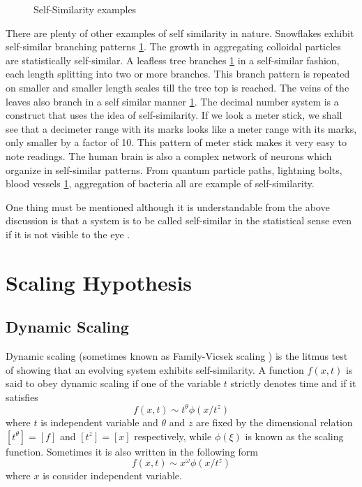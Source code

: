 \begin{figure}
		\caption{Self-Similarity examples}
		\label{fig:example-self-similarity}
	\end{figure}


	There are plenty of other examples of self similarity in nature. Snowflakes exhibit self-similar branching patterns \ref{fig:example-self-similarity}. The growth in aggregating colloidal particles are statistically self-similar. A leafless tree branches \ref{fig:example-self-similarity} in a self-similar fashion, each length splitting into two or more branches. This branch pattern is repeated on smaller and smaller length scales till the tree top is reached. The veins of the leaves also branch in a self similar manner \ref{fig:example-self-similarity}. The decimal number system is a construct that uses the idea of self-similarity. If we look a meter stick, we shall see that a decimeter range with its marks looks like a meter range with its marks, only smaller by a factor of 10. This pattern of meter stick makes it very easy to note readings. The human brain is also a complex network of neurons which organize in self-similar patterns. From quantum particle paths, lightning bolts, blood vessels \ref{fig:example-self-similarity}, aggregation of bacteria all are example of self-similarity.
	
	One thing must be mentioned although it is understandable from the above discussion is that a system is to be called self-similar in the statistical sense even if it is not visible to the eye \cite{Mandelbrot1967}.
	
	
	
\section{Scaling Hypothesis}
	\subsection{Dynamic Scaling}
	Dynamic scaling (sometimes known as Family-Vicsek scaling \cite{Family1985, Vicsek1984}) is the litmus test of showing that an evolving system exhibits self-similarity.	A function $f(x,t)$ is said to obey dynamic scaling if one of the variable $t$ strictly denotes time and if it satisfies
	\begin{equation}
		f(x,t) \sim t^\theta \phi(x/t^z)
		\label{dynamic scaling definition}
	\end{equation}
	where $t$ is independent variable and $\theta$ and $z$ are fixed by the dimensional relation $\left[t^\theta\right] = \left[f\right]$ and $\left[t^z\right] = \left[x\right]$ respectively, while $\phi(\xi)$ is known as the scaling function. Sometimes it is also written in the following form
	\begin{equation}
	f(x,t) \sim x^\omega \phi(x/t^z)
	\label{dynamic scaling definition 2}
	\end{equation}
	where $x$ is consider independent variable.
	
